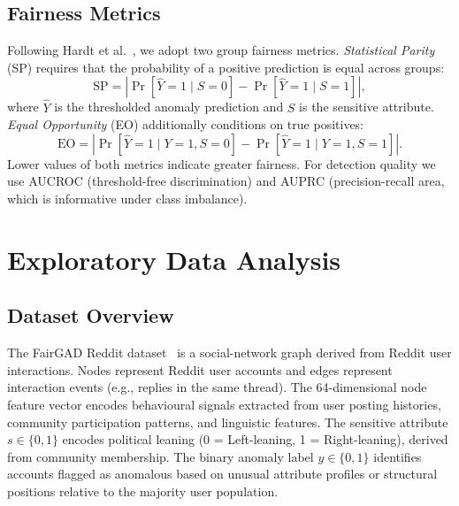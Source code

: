 \documentclass[sigconf,natbib=false]{acmart}
\begin{document}
\subsection{Fairness Metrics}

Following Hardt et al.~\cite{hardt2016equality}, we adopt two group fairness metrics. \textit{Statistical Parity} (SP) requires that the probability of a positive prediction is equal across groups:
\[
\text{SP} = \left| \Pr[\hat{Y}=1 \mid S=0] - \Pr[\hat{Y}=1 \mid S=1] \right|,
\]
where $\hat{Y}$ is the thresholded anomaly prediction and $S$ is the sensitive attribute. \textit{Equal Opportunity} (EO) additionally conditions on true positives:
\[
\text{EO} = \left| \Pr[\hat{Y}=1 \mid Y=1, S=0] - \Pr[\hat{Y}=1 \mid Y=1, S=1] \right|.
\]
Lower values of both metrics indicate greater fairness. For detection quality we use AUCROC (threshold-free discrimination) and AUPRC (precision-recall area, which is informative under class imbalance).

\section{Exploratory Data Analysis}

\subsection{Dataset Overview}

The FairGAD Reddit dataset~\cite{neoFairGraphAnomaly2024a} is a social-network graph derived from Reddit user interactions. Nodes represent Reddit user accounts and edges represent interaction events (e.g., replies in the same thread). The 64-dimensional node feature vector encodes behavioural signals extracted from user posting histories, community participation patterns, and linguistic features. The sensitive attribute $s \in \{0, 1\}$ encodes political leaning (0 = Left-leaning, 1 = Right-leaning), derived from community membership. The binary anomaly label $y \in \{0, 1\}$ identifies accounts flagged as anomalous based on unusual attribute profiles or structural positions relative to the majority user population.
\end{document}
